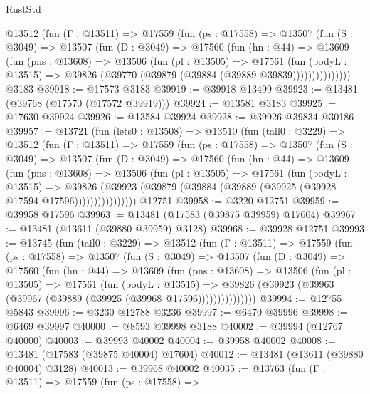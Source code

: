 \begin{lexlean}{RustStd}
\begin{coremodule}
        @13512
          (fun (Γ : @13511) =>
          @17559
            (fun (ps : @17558) =>
            @13507
              (fun (S : @3049) =>
              @13507
                (fun (D : @3049) =>
                @17560
                  (fun (hn : @44) =>
                  @13609
                    (fun (pns : @13608) =>
                    @13506
                      (fun (pl : @13505) =>
                      @17561
                        (fun (bodyL : @13515) =>
                        @39826 (@39770 (@39879 (@39884 (@39889 @39839)))))))))))))))
    @3183
@39918 := @17573 @3183
@39919 := @39918 @13499
@39923 := @13481 (@39768 (@17570 (@17572 @39919)))
@39924 := @13581 @3183
@39925 := @17630 @39924
@39926 := @13584 @39924
@39928 := @39926 @39834 @30186
@39957 := @13721
    (fun (lets0 : @13508) =>
    @13510
      (fun (tail0 : @3229) =>
      @13512
        (fun (Γ : @13511) =>
        @17559
          (fun (ps : @17558) =>
          @13507
            (fun (S : @3049) =>
            @13507
              (fun (D : @3049) =>
              @17560
                (fun (hn : @44) =>
                @13609
                  (fun (pns : @13608) =>
                  @13506
                    (fun (pl : @13505) =>
                    @17561
                      (fun (bodyL : @13515) =>
                      @39826
                        (@39923
                          (@39879 (@39884 (@39889 (@39925 (@39928 @17594 @17596))))))))))))))))
    @12751
@39958 := @3220 @12751
@39959 := @39958 @17596
@39963 := @13481 (@17583 (@39875 @39959) @17604)
@39967 := @13481 (@13611 (@39880 @39959) @3128)
@39968 := @39928 @12751
@39993 := @13745
    (fun (tail0 : @3229) =>
    @13512
      (fun (Γ : @13511) =>
      @17559
        (fun (ps : @17558) =>
        @13507
          (fun (S : @3049) =>
          @13507
            (fun (D : @3049) =>
            @17560
              (fun (hn : @44) =>
              @13609
                (fun (pns : @13608) =>
                @13506
                  (fun (pl : @13505) =>
                  @17561
                    (fun (bodyL : @13515) =>
                    @39826 (@39923 (@39963 (@39967 (@39889 (@39925 (@39968 @17596)))))))))))))))
@39994 := @12755 @5843
@39996 := @3230 @12788 @3236
@39997 := @6470 @39996
@39998 := @6469 @39997
@40000 := @8593 @39998 @3188
@40002 := @39994 (@12767 @40000)
@40003 := @39993 @40002
@40004 := @39958 @40002
@40008 := @13481 (@17583 (@39875 @40004) @17604)
@40012 := @13481 (@13611 (@39880 @40004) @3128)
@40013 := @39968 @40002
@40035 := @13763
    (fun (Γ : @13511) =>
    @17559
      (fun (ps : @17558) =>

\end{coremodule}
\end{lexlean}
